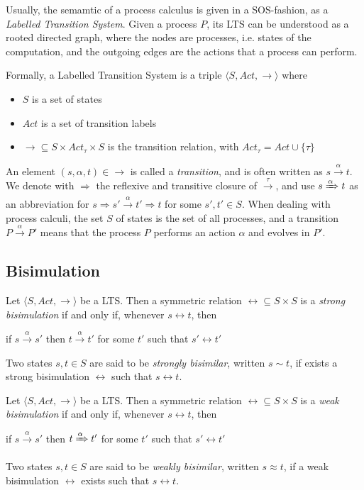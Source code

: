 Usually, the semamtic of a process calculus is given in a SOS-fashion, as a \textit{Labelled Transition System}. Given a process $P$, its LTS can be understood as a rooted directed graph, where the nodes are processes, i.e. states of the computation, and the outgoing edges are the actions that a process can perform.

Formally, a Labelled Transition System is a triple $\langle S , Act, \rightarrow \rangle$ where \begin{itemize}
\item $S$ is a set of states
\item $Act$ is a set of transition labels
\item $\rightarrow 	\subseteq S\times Act_\tau \times S$ is the transition relation, with $Act_\tau = Act \cup \{\tau\}$
\end{itemize} 

An element $(s, \alpha, t) \in \rightarrow$ is called a \textit{transition}, and is often written as $s \xrightarrow{\alpha} t$. We denote with $\Rightarrow$ the reflexive and transitive closure of $\xrightarrow{\tau}$, and use $s \xRightarrow{\alpha} t$ as an abbreviation for $s \Rightarrow s' \xrightarrow{\alpha} t' \Rightarrow t$ for some $s', t' \in S$. When dealing with process calculi, the set $S$ of states is the set of all processes, and a transition $P \xrightarrow{\alpha} P'$ means that the process $P$ performs an action $\alpha$ and evolves in $P'$.

\subsection{Bisimulation}

Let $\langle S , Act, \rightarrow \rangle$ be a LTS. Then a symmetric relation $\rel \subseteq S \times S$ is a \textit{strong bisimulation} if and only if, whenever $s \rel t$, then 
\begin{center}
if $s \xrightarrow{\alpha} s'$ then $t \xrightarrow{\alpha} t'$ for some $t'$ such that $s' \rel t'$
\end{center}
Two states $s, t \in S$ are said to be \textit{strongly bisimilar}, written $s \sim t$, if exists a strong bisimulation $\rel$ such that $s \rel t$.


Let $\langle S , Act, \rightarrow \rangle$ be a LTS. Then a symmetric relation $\rel \subseteq S \times S$ is a \textit{weak bisimulation} if and only if, whenever $s \rel t$, then 
\begin{center}
if $s \xrightarrow{\alpha} s'$ then $t \xRightarrow{\alpha} t'$ for some $t'$ such that $s' \rel t'$
\end{center}
Two states $s, t \in S$ are said to be \textit{weakly bisimilar}, written $s \approx t$, if a weak bisimulation $\rel$ exists such that $s \rel t$. 


